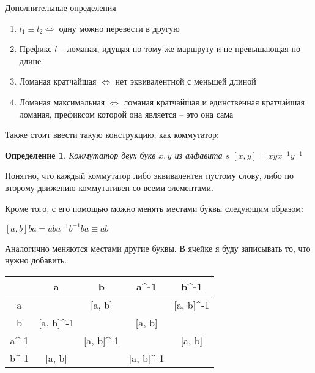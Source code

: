 \documentclass[serif, ucs]{beamer}
\newtheorem{Def}{Определение}[section]
\begin{document}
\begin{frame}{Дополнительные определения}
	\begin{enumerate}
		\item $l_1 \equiv l_2\Longleftrightarrow$ одну можно перевести в другую
		\item Префикс $l$ -- ломаная, идущая по тому же маршруту и не превышающая по длине
		\item Ломаная кратчайшая $\Longleftrightarrow$ нет эквивалентной с меньшей длиной
		\item Ломаная максимальная $\Longleftrightarrow$ ломаная кратчайшая и единственная кратчайшая ломаная, префиксом которой она является -- это она сама
	\end{enumerate}
\end{frame}

\begin{frame}
	\begin{footnotesize}
	Также стоит ввести такую конструкцию, как коммутатор:
	
	\begin{Def}
		Коммутатор двух букв $x, y$ из алфавита $s$  $[x, y] = xyx^{-1}y^{-1}$ 
	\end{Def}
	
	Понятно, что каждый коммутатор либо эквивалентен пустому слову, либо по второму движению коммутативен со всеми элементами.
	
	Кроме того, с его помощью можно менять местами буквы следующим образом:
	
	$[a, b] ba = aba^{-1}b^{-1}ba\equiv ab$
	
	Аналогично меняются местами другие буквы. В ячейке я буду записывать то, что нужно добавить.
	
	\begin{tabular}{C|C|C|C|C|}
		&a&b&a^{-1}&b^{-1}\\
		\hline
		a&\times &[a, b]&\times&[a, b]^{-1}\\
		\hline
		b&[a, b]^{-1}&\times&[a, b]&\times\\
		\hline
		a^{-1}&\times&[a, b]^{-1}&\times&[a, b]\\
		\hline
		b^{-1}&[a, b]&\times&[a, b]^{-1}&\times\\
	\end{tabular}
	\end{footnotesize}
\end{frame}
\end{document}

